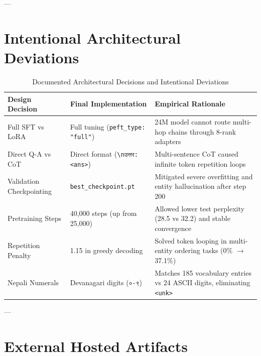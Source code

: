 \documentclass[11pt,a4paper]{article}
\begin{document}
---

\section{Intentional Architectural Deviations}

\begin{table}[H]
\centering
\small
\caption{Documented Architectural Decisions and Intentional Deviations}
\label{tab:deviations}
\begin{tabular}{@{}lll@{}}
\toprule
\textbf{Design Decision} & \textbf{Final Implementation} & \textbf{Empirical Rationale} \\
\midrule
Full SFT vs LoRA & Full tuning (\texttt{peft\_type: "full"}) & 24M model cannot route multi-hop chains through 8-rank adapters \\
Direct Q-A vs CoT & Direct format (\texttt{\textbackslash nउत्तर: <ans>}) & Multi-sentence CoT caused infinite token repetition loops \\
Validation Checkpointing & \texttt{best\_checkpoint.pt} & Mitigated severe overfitting and entity hallucination after step 200 \\
Pretraining Steps & 40,000 steps (up from 25,000) & Allowed lower test perplexity (28.5 vs 32.2) and stable convergence \\
Repetition Penalty & 1.15 in greedy decoding & Solved token looping in multi-entity ordering tasks (0\% $\to$ 37.1\%) \\
Nepali Numerals & Devanagari digits (\texttt{०-९}) & Matches 185 vocabulary entries vs 24 ASCII digits, eliminating \texttt{<unk>} \\
\bottomrule
\end{tabular}
\end{table}

---

\section{External Hosted Artifacts}
\end{document}
